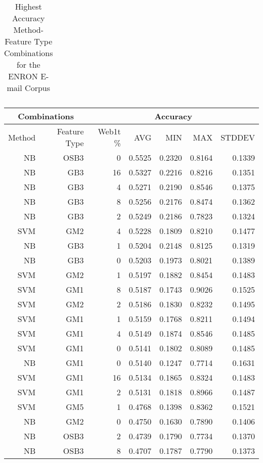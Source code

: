 \begin{table}[htbp!]
\begin{center}
\begin{tabular}{ | r | r | r | r | r | r | r | }
			\end{tabular}
		\caption{Highest Accuracy Method-Feature Type Combinations for the ENRON E-mail Corpus}
		\label{tab:enron-accuracy-filtered-ranked}
		\end{center}
	\end{table}
	

	
	\begin{table}[htbp!]
	\begin{center}
			\begin{tabular}{ | r | r | r | r | r | r | r | }
			\hline
			\multicolumn{2}{|c|}{Combinations} & \multicolumn{5}{|c|}{Accuracy}\\
			\hline
			Method & Feature Type & Web1t \% & AVG & MIN & MAX & STDDEV\\ \hline 
			NB & OSB3 & 0 & 0.5525 & 0.2320 & 0.8164 & 0.1339\\ \hline 
			NB & GB3 & 16 & 0.5327 & 0.2216 & 0.8216 & 0.1351\\ \hline 
			NB & GB3 & 4 & 0.5271 & 0.2190 & 0.8546 & 0.1375\\ \hline 
			NB & GB3 & 8 & 0.5256 & 0.2176 & 0.8474 & 0.1362\\ \hline 
			NB & GB3 & 2 & 0.5249 & 0.2186 & 0.7823 & 0.1324\\ \hline 
			SVM & GM2 & 4 & 0.5228 & 0.1809 & 0.8210 & 0.1477\\ \hline 
			NB & GB3 & 1 & 0.5204 & 0.2148 & 0.8125 & 0.1319\\ \hline 
			NB & GB3 & 0 & 0.5203 & 0.1973 & 0.8021 & 0.1389\\ \hline 
			SVM & GM2 & 1 & 0.5197 & 0.1882 & 0.8454 & 0.1483\\ \hline 
			SVM & GM1 & 8 & 0.5187 & 0.1743 & 0.9026 & 0.1525\\ \hline 
			SVM & GM2 & 2 & 0.5186 & 0.1830 & 0.8232 & 0.1495\\ \hline 
			SVM & GM1 & 1 & 0.5159 & 0.1768 & 0.8211 & 0.1494\\ \hline 
			SVM & GM1 & 4 & 0.5149 & 0.1874 & 0.8546 & 0.1485\\ \hline 
			SVM & GM1 & 0 & 0.5141 & 0.1802 & 0.8089 & 0.1485\\ \hline 
			NB & GM1 & 0 & 0.5140 & 0.1247 & 0.7714 & 0.1631\\ \hline 
			SVM & GM1 & 16 & 0.5134 & 0.1865 & 0.8324 & 0.1483\\ \hline 
			SVM & GM1 & 2 & 0.5131 & 0.1818 & 0.8966 & 0.1487\\ \hline 
			SVM & GM5 & 1 & 0.4768 & 0.1398 & 0.8362 & 0.1521\\ \hline 
			NB & GM2 & 0 & 0.4750 & 0.1630 & 0.7890 & 0.1406\\ \hline 
			NB & OSB3 & 2 & 0.4739 & 0.1790 & 0.7734 & 0.1370\\ \hline 
			NB & OSB3 & 8 & 0.4707 & 0.1787 & 0.7790 & 0.1373\\ \hline 


\end{tabular}
\end{center}
\end{table}
